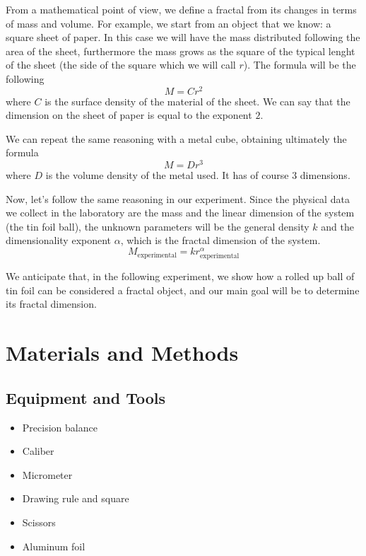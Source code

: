 \documentclass[a4paper,12pt]{article}
\begin{document}
\par From a mathematical point of view, we define a fractal from its changes 
in terms of mass and volume. For example, we start from an object that we know: 
a square sheet of paper. In this case we will have the mass distributed following the area of 
the sheet, furthermore the mass grows as the square of the typical lenght of the 
sheet (the side of the square which we will call $r$). The formula will be the 
following 
\[ M = C r^2 \]
where $C$ is the surface density of the material of the sheet. We can say that the 
dimension on the sheet of paper is equal to the exponent $2$.

We can repeat the same reasoning with a metal cube, obtaining ultimately the formula
\[ M = D r^3 \]
where $D$ is the volume density of the metal used. It has of course $3$ dimensions.

\par Now, let's follow the same reasoning in our experiment. Since the physical data we 
collect in the laboratory are the mass and the linear dimension of the system 
(the tin foil ball), the unknown parameters will be the general density $k$ and 
the dimensionality exponent $\alpha$, which is the fractal dimension of the system.
\begin{equation} 
    M_{\text{experimental}} = k r_{\text{experimental}}^{\alpha}
    \label{eq:gen_fractal}
\end{equation}   

We anticipate that, in the following experiment, we show how a rolled up ball of 
tin foil can be considered a fractal object, and our main goal will be to determine its fractal dimension.

\section{Materials and Methods}
\subsection{Equipment and Tools}
\begin{itemize}
    \item Precision balance
    \item Caliber
    \item Micrometer
    \item Drawing rule and square
    \item Scissors
    \item Aluminum foil
\end{itemize}
\end{document}
